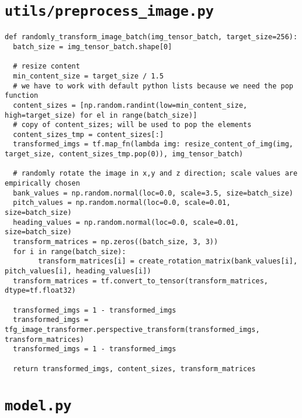 \section*{\lstinline{utils/preprocess_image.py}}

\begin{code}
  \begin{verbatim}
def randomly_transform_image_batch(img_tensor_batch, target_size=256):
  batch_size = img_tensor_batch.shape[0]

  # resize content
  min_content_size = target_size / 1.5
  # we have to work with default python lists because we need the pop function
  content_sizes = [np.random.randint(low=min_content_size, high=target_size) for el in range(batch_size)]
  # copy of content_sizes; will be used to pop the elements
  content_sizes_tmp = content_sizes[:]
  transformed_imgs = tf.map_fn(lambda img: resize_content_of_img(img, target_size, content_sizes_tmp.pop(0)), img_tensor_batch)

  # randomly rotate the image in x,y and z direction; scale values are empirically chosen
  bank_values = np.random.normal(loc=0.0, scale=3.5, size=batch_size)
  pitch_values = np.random.normal(loc=0.0, scale=0.01, size=batch_size)
  heading_values = np.random.normal(loc=0.0, scale=0.01, size=batch_size)
  transform_matrices = np.zeros((batch_size, 3, 3))
  for i in range(batch_size):
        transform_matrices[i] = create_rotation_matrix(bank_values[i], pitch_values[i], heading_values[i])
  transform_matrices = tf.convert_to_tensor(transform_matrices, dtype=tf.float32)

  transformed_imgs = 1 - transformed_imgs
  transformed_imgs = tfg_image_transformer.perspective_transform(transformed_imgs, transform_matrices)
  transformed_imgs = 1 - transformed_imgs

  return transformed_imgs, content_sizes, transform_matrices
\end{verbatim}
  \label{lst:pictogram-augmentation}
  \end{code}

\section*{\lstinline{model.py}}


